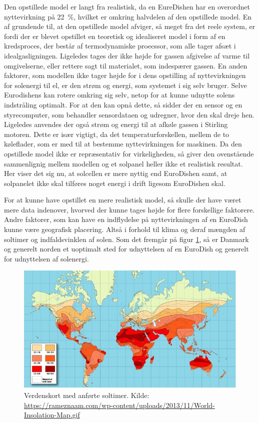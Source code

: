 \documentclass[SRC.tex]{subfiles}
\begin{document}
	Den opstillede model er langt fra realistisk, da en EureDishen har en overordnet nyttevirkning 
	på \SI{22}{\percent}, hvilket er omkring halvdelen af den opstillede model. %
	En af grundende til, at den opstillede model afviger, så meget fra det reele system, er fordi
	der er blevet opstillet en teoretisk og idealiseret model i form af en kredsproces, der består af termodynamiske proecssor, som alle tager afsæt i idealgasligningen. Ligeledes tages der ikke højde
	for gassen afgivelse af varme til omgivelserne, eller rettere sagt til materialet, som indespærer gassen. En anden faktorer, som modellen ikke tager højde for i dens opstilling af nyttevirkningen for solenergi til el, er den strøm og energi, som systemet i sig selv bruger. Selve Eurodishens kan rotere omkring sig selv, netop for at kunne udnytte solens indstråling optimalt. For at den kan opnå dette, så sidder der en sensor og en styrecomputer, som behandler sensordataen og udregner, hvor den skal dreje hen. Ligeledes anvendes der også strøm og energi til at afkøle gassen i Stirling motoren. Dette er især vigtigt, da det temperaturforskellen, mellem de to køleflader, som er med til at bestemme nyttevirkningen for maskinen. Da den opstillede model ikke er repræsentativ for virkeligheden, så giver den ovenstående sammenlignig mellem modellen og et solpanel heller ikke et realistisk resultat. Her viser det sig nu, at solcellen er mere nyttig end EuroDishen samt, at solpanelet ikke skal tilføres noget energi i drift ligesom EuroDishen skal. 
	
	For at kunne have opstillet en mere realistisk model, så skulle der have været mere data indenover, hvorved der kunne tages højde for flere forskellige faktorere. Andre faktorer, som kan have en indflydelse på nyttevirkningen af en EuroDish kunne være geografisk placering. Altså i forhold til klima og deraf mængden af soltimer og indfaldsvinklen af solen. Som det fremgår på figur \ref{fig:world-solar-isolation-map}, så er Danmark og generelt norden et uoptimalt sted for udnyttelsen af en EuroDish og generelt for udnyttelsen af solenergi. 
	
	\begin{figure}[h!]
		\centering
		\includegraphics[width=0.7\linewidth]{"Billeder/World solar isolation map"}
		\caption{Verdenskort med anførte soltimer. Kilde: \url{https://rameznaam.com/wp-content/uploads/2013/11/World-Insolation-Map.gif}}
		\label{fig:world-solar-isolation-map}
	\end{figure}
	
\end{document}
